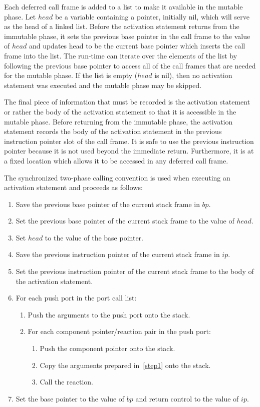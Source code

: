 Each deferred call frame is added to a list to make it available in the mutable phase.
Let $head$ be a variable containing a pointer, initially nil, which will serve as the head of a linked list.
Before the activation statement returns from the immutable phase, it sets the previous base pointer in the call frame to the value of $head$ and updates head to be the current base pointer which inserts the call frame into the list.
The run-time can iterate over the elements of the list by following the previous base pointer to access all of the call frames that are needed for the mutable phase.
If the list is empty ($head$ is nil), then no activation statement was executed and the mutable phase may be skipped.

The final piece of information that must be recorded is the activation statement or rather the body of the activation statement so that it is accessible in the mutable phase.
Before returning from the immutable phase, the activation statement records the body of the activation statement in the previous instruction pointer slot of the call frame.
It is safe to use the previous instruction pointer because it is not used beyond the immediate return.
Furthermore, it is at a fixed location which allows it to be accessed in any deferred call frame.

The synchronized two-phase calling convention is used when executing an activation statement and proceeds as follows:
\begin{enumerate}
\item Save the previous base pointer of the current stack frame in $bp$.
\item Set the previous base pointer of the current stack frame to the value of $head$.
\item Set $head$ to the value of the base pointer.
\item Save the previous instruction pointer of the current stack frame in $ip$.
\item Set the previous instruction pointer of the current stack frame to the body of the activation statement.
\item For each push port in the port call list:
  \begin{enumerate}
  \item Push the arguments to the push port onto the stack.\label{step1}
  \item For each component pointer/reaction pair in the push port:
    \begin{enumerate}
    \item Push the component pointer onto the stack.
    \item Copy the arguments prepared in~\ref{step1} onto the stack.
    \item Call the reaction.
    \end{enumerate}
  \end{enumerate}
\item Set the base pointer to the value of $bp$ and return control to the value of $ip$.
\end{enumerate}

